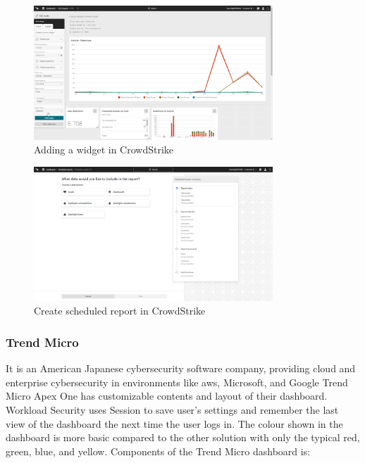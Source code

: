 \begin{figure}[htbp]
      \centering
      \includegraphics[width=0.8\textwidth]{Figures/CrowdStrike/add-widget.png}
      \caption{Adding a widget in CrowdStrike}
\end{figure}


\begin{figure}[htbp]
      \centering
      \includegraphics[width=0.8\textwidth]{Figures/CrowdStrike/Scheduled_Report.png}
      \caption{Create scheduled report in CrowdStrike}
\end{figure}


\subsubsection{Trend Micro} %
It is an American Japanese cybersecurity software company, providing cloud and enterprise cybersecurity in
environments like \acrshort{aws}, Microsoft, and Google Trend Micro Apex One has customizable contents and
layout of their dashboard. Workload Security uses Session to save user's settings and remember the last view
of the dashboard the next time the user logs in. The colour shown in the dashboard is more basic compared to
the other solution with only the typical red, green, blue, and yellow. Components of the
Trend Micro dashboard is:


